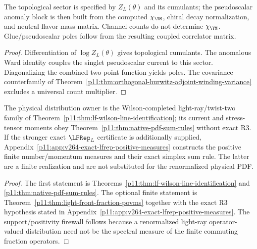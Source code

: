 \documentclass[12pt,a4paper]{article}
\begin{document}
\begin{theorem}
\label{p11:thm:block-c-topology-pseudoscalar-separation}

The topological sector is specified by \(Z_L(\theta)\) and its cumulants; the pseudoscalar anomaly block is then built from the computed \(\chi_{\YM}\), chiral decay normalization, and neutral flavor mass matrix.  Channel counts do not determine \(\chi_{\YM}\).  Glue/pseudoscalar poles follow from the resulting coupled correlator matrix.
\label{p11:eq:block-c-topological-variance-factor}
\label{p11:eq:block-c-anomaly-mass-bridge}
\label{p11:eq:block-c-pseudoscalar-glue-pole-equation}
\end{theorem}
\begin{proof}

Differentiation of \(\log Z_L(\theta)\) gives topological cumulants.  The anomalous Ward identity couples the singlet pseudoscalar current to this sector.  Diagonalizing the combined two-point function yields poles.  The covariance counterfamily of Theorem~\ref{p11:thm:orthogonal-hurwitz-adjoint-winding-variance} excludes a universal count multiplier.
\end{proof}

\begin{theorem}
\label{p11:thm:block-d-finite-distribution-spectral-measures}
The physical distribution owner is the Wilson-completed light-ray/twist-two
family of Theorem~\ref{p11:thm:lf-wilson-line-identification}; its current and
stress-tensor moments obey Theorem~\ref{p11:thm:native-pdf-sum-rules} without
exact R3.  If the stronger exact \(\LFRep_L\) certificate is additionally
supplied, Appendix~\ref{p11:app:v264-exact-lfrep-positive-measures} constructs
the positive finite number/momentum measures and their exact simplex sum rule.
The latter are a finite realization and are not substituted for the
renormalized physical PDF.
\label{p11:eq:block-d-pdf-spectral-measure}
\label{p11:eq:block-d-moment-readout}
\end{theorem}
\begin{proof}
The first statement is Theorems~\ref{p11:thm:lf-wilson-line-identification} and
\ref{p11:thm:native-pdf-sum-rules}.  The optional finite statement is
Theorem~\ref{p11:thm:light-front-fraction-povms} together with the exact R3
hypothesis stated in Appendix~\ref{p11:app:v264-exact-lfrep-positive-measures}.
The support/positivity firewall follows because a renormalized light-ray
operator-valued distribution need not be the spectral measure of the finite
commuting fraction operators.
\end{proof}
\end{document}
